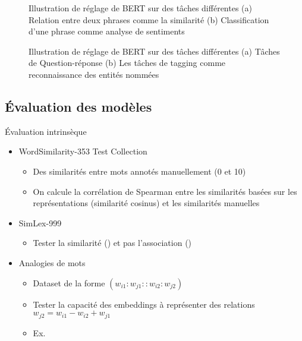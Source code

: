 \documentclass{KodeBook}
\begin{document}
\begin{figure}
	\caption{Illustration de réglage de BERT sur des tâches différentes \cite{2019-devlin-al}
		(a) Relation entre deux phrases comme la similarité (b) Classification d'une phrase comme analyse de sentiments
	}
\end{figure}

\begin{figure}
	\caption{Illustration de réglage de BERT sur des tâches différentes \cite{2019-devlin-al}
		(a) Tâches de Question-réponse (b) Les tâches de tagging comme reconnaissance des entités nommées
	}
\end{figure}

\subsection{Évaluation des modèles}

Évaluation intrinsèque
\begin{itemize}
	\item  WordSimilarity-353 Test Collection \cite{2002-finkelstein-al}
	\begin{itemize}
		\item Des similarités entre mots annotés manuellement (0 et 10)
		\item On calcule la corrélation de Spearman entre les similarités basées sur les représentations (similarité cosinus) et les similarités manuelles
	\end{itemize}
	
	\item SimLex-999 \cite{2015-hill-al}
	\begin{itemize}
		\item Tester la similarité () et pas l'association ()
	\end{itemize}
	
	\item Analogies de mots \cite{2013-mikolov-al2}
	\begin{itemize}
		\item Dataset de la forme $(w_{i1}:w_{j1} :: w_{i2}:w_{j2})$
		\item Tester la capacité des embeddings à représenter des relations $w_{j2} = w_{i1} - w_{i2} + w_{j1}$
		\item Ex. 
	\end{itemize}
	
\end{itemize}
\end{document}
